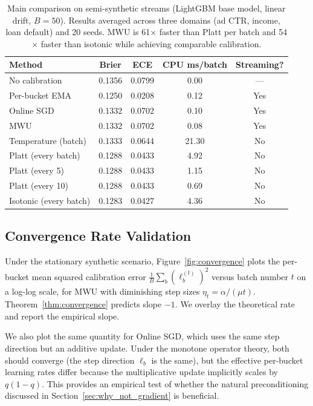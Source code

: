 \documentclass[12pt, letterpaper]{article}
\theoremstyle{definition}
\theoremstyle{remark}
\begin{document}
\begin{table}[H]
\centering
\begin{tabular}{@{}lcccc@{}}
\toprule
Method & Brier & ECE & CPU ms/batch & Streaming?\\
\midrule
No calibration & 0.1356 & 0.0799 & 0.00 & ---\\
Per-bucket EMA & 0.1250 & 0.0208 & 0.12 & Yes\\
Online SGD & 0.1332 & 0.0702 & 0.10 & Yes\\
MWU & 0.1332 & 0.0702 & 0.08 & Yes\\
Temperature (batch) & 0.1333 & 0.0644 & 21.30 & No\\
Platt (every batch) & 0.1288 & 0.0433 & 4.92 & No\\
Platt (every 5) & 0.1288 & 0.0433 & 1.15 & No\\
Platt (every 10) & 0.1288 & 0.0433 & 0.69 & No\\
Isotonic (every batch) & 0.1283 & 0.0427 & 4.36 & No\\
\bottomrule
\end{tabular}
\caption{Main comparison on semi-synthetic streams (LightGBM base model, linear drift, $B=50$). Results averaged across three domains (ad CTR, income, loan default) and 20 seeds. MWU is 61$\times$ faster than Platt per batch and 54$\times$ faster than isotonic while achieving comparable calibration.}
\label{tab:main_comparison}
\end{table}

\subsection{Convergence Rate Validation}

Under the stationary synthetic scenario, Figure~\ref{fig:convergence} plots the per-bucket mean squared calibration error $\frac{1}{B}\sum_b (\ell_b^{(t)})^2$ versus batch number $t$ on a log-log scale, for MWU with diminishing step sizes $\eta_t = \alpha/(\mu t)$. Theorem~\ref{thm:convergence} predicts slope $-1$. We overlay the theoretical rate and report the empirical slope.

We also plot the same quantity for Online SGD, which uses the same step direction but an additive update. Under the monotone operator theory, both should converge (the step direction $\ell_b$ is the same), but the effective per-bucket learning rates differ because the multiplicative update implicitly scales by $q(1-q)$. This provides an empirical test of whether the natural preconditioning discussed in Section~\ref{sec:why_not_gradient} is beneficial.
\end{document}
